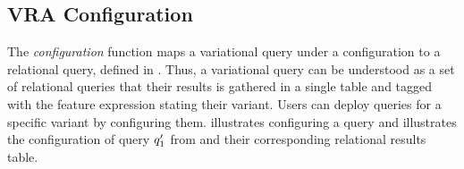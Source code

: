 \subsection{VRA Configuration}
\label{sec:vraconf}



%

%
The \emph{configuration} function maps a variational query under
a configuration
to a relational query, defined in . Thus, a variational query 
can be understood as a set of relational queries that their results is gathered
in a single table and tagged with the feature expression stating their variant.
%
Users can deploy queries for a specific variant by configuring 
them.
%
 illustrates configuring a query
and  illustrates the configuration of query $\VVal {\vQ_1}$ from  and their corresponding relational results table.

%


